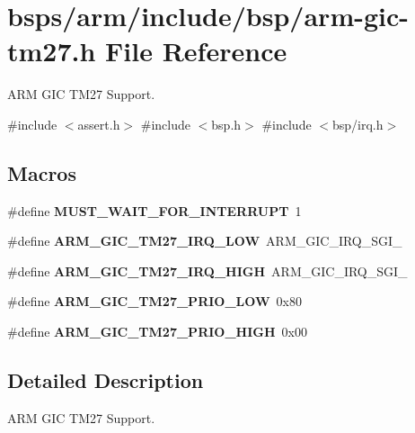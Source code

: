 \hypertarget{arm-gic-tm27_8h}{}\section{bsps/arm/include/bsp/arm-\/gic-\/tm27.h File Reference}
\label{arm-gic-tm27_8h}


A\+RM G\+IC T\+M27 Support.  


{\ttfamily \#include $<$assert.\+h$>$}\newline
{\ttfamily \#include $<$bsp.\+h$>$}\newline
{\ttfamily \#include $<$bsp/irq.\+h$>$}\newline
\subsection*{Macros}
\begin{DoxyCompactItemize}
\item 
\mbox{\label{arm-gic-tm27_8h_a00a44436eb28b5b03d1cba2dcdf7382f}} 
\#define {\bfseries M\+U\+S\+T\+\_\+\+W\+A\+I\+T\+\_\+\+F\+O\+R\+\_\+\+I\+N\+T\+E\+R\+R\+U\+PT}~1
\item 
\mbox{\label{arm-gic-tm27_8h_a9c35b70b96af8bb0194141fd153a3a2c}} 
\#define {\bfseries A\+R\+M\+\_\+\+G\+I\+C\+\_\+\+T\+M27\+\_\+\+I\+R\+Q\+\_\+\+L\+OW}~A\+R\+M\+\_\+\+G\+I\+C\+\_\+\+I\+R\+Q\+\_\+\+S\+G\+I\+\_
\item 
\mbox{\label{arm-gic-tm27_8h_afe2d3c2a9e95377ba8e203982a7c5f96}} 
\#define {\bfseries A\+R\+M\+\_\+\+G\+I\+C\+\_\+\+T\+M27\+\_\+\+I\+R\+Q\+\_\+\+H\+I\+GH}~A\+R\+M\+\_\+\+G\+I\+C\+\_\+\+I\+R\+Q\+\_\+\+S\+G\+I\+\_
\item 
\mbox{\label{arm-gic-tm27_8h_ab4600a5c4cbaedb02544b6682b2cc185}} 
\#define {\bfseries A\+R\+M\+\_\+\+G\+I\+C\+\_\+\+T\+M27\+\_\+\+P\+R\+I\+O\+\_\+\+L\+OW}~0x80
\item 
\mbox{\label{arm-gic-tm27_8h_a90fa1d9c707943a5ce0f4c6eda541064}} 
\#define {\bfseries A\+R\+M\+\_\+\+G\+I\+C\+\_\+\+T\+M27\+\_\+\+P\+R\+I\+O\+\_\+\+H\+I\+GH}~0x00
\end{DoxyCompactItemize}


\subsection{Detailed Description}
A\+RM G\+IC T\+M27 Support. 

